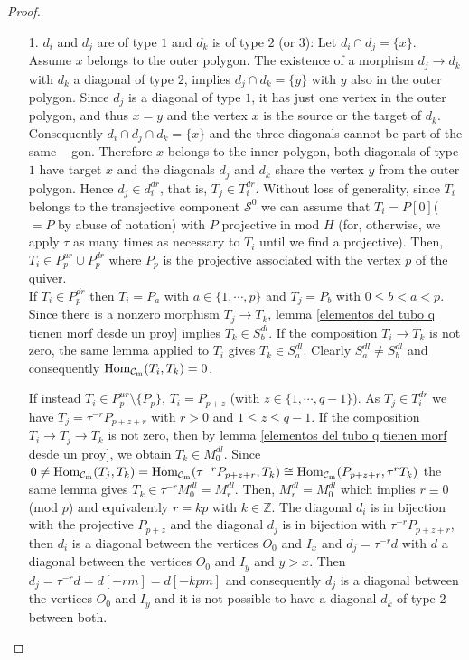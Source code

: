 \documentclass{amsart}
\theoremstyle{plain}
\theoremstyle{definition}
\begin{document}
\begin{proof}
\begin{itemize}
\begin{itemize}
  \item [1.] $d_i$ and $d_j$ are of type $1$ and $d_k$ is of type $2$ (or $3$):
   Let $d_i\cap d_j=\{x\}$. Assume  $x$ belongs to the outer polygon. The existence of a morphism $d_j\rightarrow d_k$ with  $d_k $ a diagonal of type $2$, implies $d_j\cap d_k=\{y\}$ with $y$ also in the outer polygon. Since $d_j$ is a  diagonal of type $1$, it has just one vertex in the outer polygon,  and thus  $x=y$ and the vertex $x$ is the source or the target  of $d_k$. Consequently  $d_i\cap d_j \cap d_k=\{x\}$ and the three  diagonals cannot be  part of the same   ${\mathop{(m+2)}\nolimits}$-gon. Therefore $x$ belongs to the inner  polygon, both diagonals of type $1$ have target  $x$ and the   diagonals $d_j$ and $d_k$ share the vertex  $y$ from the outer polygon. Hence $d_j\in d_i^{dr}$, that is,   $T_j\in T_i^{dr}$. Without loss of generality, since $T_i$ belongs to the  transjective component $\mathcal{S}^0$ we can assume that $T_i=P[0]$( $=P$ by abuse of notation) with $P$   projective in   mod $H$ (for, otherwise, we  apply  $\tau$ as many times as necessary to $T_i$ until we find a projective). Then,  $T_i\in P_p^{ur}\cup P_p^{dr}$ where $P_p$ is the projective associated with the vertex $p$ of the quiver.\\
   If  $T_i\in P_p^{dr} $ then  $T_i=P_a$ with  $a\in \{1,\cdots,p\}$ and $T_j=P_b$ with $0\leq b<a<p$. Since there is a nonzero  morphism $T_j\rightarrow T_k$, lemma \ref{elementos del tubo q tienen morf desde un proy} implies  $T_k\in S_b^{dl}$. If the  composition $T_i\rightarrow T_k$ is not zero, the same lemma applied to $T_i$ gives $T_k\in S_a^{dl}$. Clearly $S_a^{dl}\neq S_b^{dl}$ and consequently ${\mathop{\rm Hom_{\mathcal{C}_m}}\nolimits}(T_i,T_k)=0$.

  If instead  $T_i\in P_p^{ur}\setminus \{ P_p \}$, $T_i=P_{p+z}$    (with $z\in \{1, \cdots, q-1\}$). As  $T_j\in T_i^{dr}$ we have  $T_j=\tau^{-r}P_{p+z+r}$ with $r>0$ and $1\leq z \leq q-1$.  If the composition $T_i\rightarrow T_j\rightarrow T_k$ is not zero, then  by lemma \ref{elementos del tubo q tienen morf desde un proy}, we obtain $T_k\in M_0^{dl}$.  Since $0\neq {\mathop{\rm Hom_{\mathcal{C}_m}}\nolimits}(T_j,T_k)={\mathop{\rm Hom_{\mathcal{C}_m}}\nolimits}(\tau ^{-r}P_{p+z+r}, T_k)\cong {\mathop{\rm Hom_{\mathcal{C}_m}}\nolimits}(P_{p+z+r},\tau^rT_k)$  the same lemma gives  $T_k\in \tau^{-r}M_0^{dl}=M_r^{dl}$. Then, $M_r^{dl}=M_0^{dl}$ which implies  $r\equiv 0$ (mod $p$) and equivalently $r=kp$ with $k\in \mathbb{Z}$. The diagonal $d_i$ is in bijection with the projective $P_{p+z}$ and the diagonal $d_j$ is  in  bijection with $\tau ^{-r}P_{p+z+r}$, then $d_i$ is a  diagonal between the vertices $O_0$ and $I_x$  and  $d_j=\tau^{-r}d$ with  $d$ a diagonal between the vertices $O_0$ and $I_y$  and   $y> x$.  Then $d_j=\tau^{-r}d=d[-rm]=d[-kpm]$  and consequently $d_j$ is a diagonal  between the vertices $O_0$ and $I_y$ and it is not possible to have a diagonal $d_k$ of type $2$ between both.\\


\end{itemize}
\end{itemize}
\end{proof}
\end{document}
